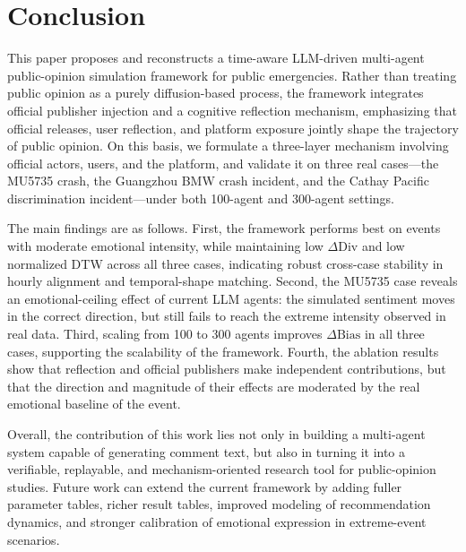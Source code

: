 \section{Conclusion}

This paper proposes and reconstructs a time-aware LLM-driven multi-agent public-opinion simulation framework for public emergencies. Rather than treating public opinion as a purely diffusion-based process, the framework integrates official publisher injection and a cognitive reflection mechanism, emphasizing that official releases, user reflection, and platform exposure jointly shape the trajectory of public opinion. On this basis, we formulate a three-layer mechanism involving official actors, users, and the platform, and validate it on three real cases---the MU5735 crash, the Guangzhou BMW crash incident, and the Cathay Pacific discrimination incident---under both 100-agent and 300-agent settings.

The main findings are as follows. First, the framework performs best on events with moderate emotional intensity, while maintaining low \(\Delta\mathrm{Div}\) and low normalized DTW across all three cases, indicating robust cross-case stability in hourly alignment and temporal-shape matching. Second, the MU5735 case reveals an emotional-ceiling effect of current LLM agents: the simulated sentiment moves in the correct direction, but still fails to reach the extreme intensity observed in real data. Third, scaling from 100 to 300 agents improves \(\Delta\mathrm{Bias}\) in all three cases, supporting the scalability of the framework. Fourth, the ablation results show that reflection and official publishers make independent contributions, but that the direction and magnitude of their effects are moderated by the real emotional baseline of the event.

Overall, the contribution of this work lies not only in building a multi-agent system capable of generating comment text, but also in turning it into a verifiable, replayable, and mechanism-oriented research tool for public-opinion studies. Future work can extend the current framework by adding fuller parameter tables, richer result tables, improved modeling of recommendation dynamics, and stronger calibration of emotional expression in extreme-event scenarios.
